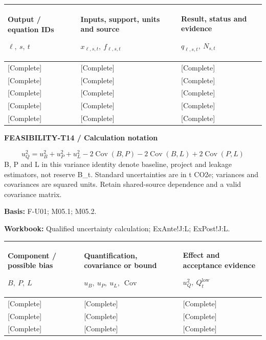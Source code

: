 {\sffamily\fontsize{8.3}{10.3}\selectfont\begin{longtable}{@{}P{49.49mm} P{65.99mm} P{49.49mm}@{}}
\toprule
\textbf{Output / equation IDs}\par {\normalfont\fontsize{8.2}{10}\selectfont $\ell,\ s,\ t$} & \textbf{Inputs, support, units and source}\par {\normalfont\fontsize{8.2}{10}\selectfont $x_{\ell,s,t},\ f_{\ell,s,t}$} & \textbf{Result, status and evidence}\par {\normalfont\fontsize{8.2}{10}\selectfont $q_{\ell,s,t},\ N_{s,t}$}\\\midrule\endhead
\rule{0pt}{7.7mm}[Complete] & [Complete] & [Complete]\\\hline
\rule{0pt}{7.7mm}[Complete] & [Complete] & [Complete]\\\hline
\rule{0pt}{7.7mm}[Complete] & [Complete] & [Complete]\\\hline
\rule{0pt}{7.7mm}[Complete] & [Complete] & [Complete]\\\hline
\rule{0pt}{7.7mm}[Complete] & [Complete] & [Complete]\\\hline
\end{longtable}}
\par\begingroup\sffamily\fontsize{8}{10}\selectfont\color{NEBGreen}\setlength{\parskip}{2pt}\setlength{\abovedisplayskip}{4pt}\setlength{\belowdisplayskip}{4pt}\setlength{\abovedisplayshortskip}{2pt}\setlength{\belowdisplayshortskip}{3pt}
\textbf{FEASIBILITY-T14 / Calculation notation}\par
{\fontsize{9}{11}\selectfont\[ u_Q^2=u_B^2+u_P^2+u_L^2-2\operatorname{Cov}(B,P)-2\operatorname{Cov}(B,L)+2\operatorname{Cov}(P,L) \]}
B, P and L in this variance identity denote baseline, project and leakage estimators, not reserve B\_t. Standard uncertainties are in t CO2e; variances and covariances are squared units. Retain shared-source dependence and a valid covariance matrix.\par
\textbf{Basis:} F-U01; M05.1; M05.2.\par
\textbf{Workbook:} Qualified uncertainty calculation; ExAnte!J:L; ExPost!J:L.\par\endgroup
{\sffamily\fontsize{8.3}{10.3}\selectfont\begin{longtable}{@{}P{51.14mm} P{62.69mm} P{51.14mm}@{}}
\toprule
\textbf{Component / possible bias}\par {\normalfont\fontsize{8.2}{10}\selectfont $B,\ P,\ L$} & \textbf{Quantification, covariance or bound}\par {\normalfont\fontsize{8.2}{10}\selectfont $u_B,\ u_P,\ u_L,\ \operatorname{Cov}$} & \textbf{Effect and acceptance evidence}\par {\normalfont\fontsize{8.2}{10}\selectfont $u_Q^2,\ Q_t^{\mathrm{low}}$}\\\midrule\endhead
\rule{0pt}{7.7mm}[Complete] & [Complete] & [Complete]\\\hline
\rule{0pt}{7.7mm}[Complete] & [Complete] & [Complete]\\\hline
\rule{0pt}{7.7mm}[Complete] & [Complete] & [Complete]\\\hline
\end{longtable}}
